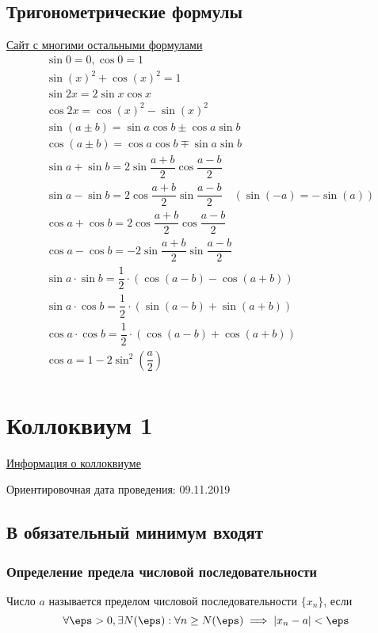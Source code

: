 \documentclass[12pt, a4paper]{article}
\begin{document}
	\subsection{Тригонометрические формулы}
	\href{https://mnogoformul.ru/vse-formuly-po-trigonometrii}{Сайт с многими остальными формулами}
	\begin{align*}
		&\sin 0 = 0, \cos 0 = 1 \\
		&\sin (x)^2 + \cos (x)^2 = 1 \\
		&\sin 2x = 2 \sin x \cos x \\
		&\cos 2x = \cos (x)^2 - \sin (x)^2 \\
		&\sin(a \pm b) = \sin a \cos b \pm \cos a \sin b \\
		&\cos(a \pm b) = \cos a \cos b \mp \sin a \sin b \\
		&\sin a + \sin b = 2 \sin \dfrac{a + b}{2} \cos \dfrac{a - b}{2} \\
		&\sin a - \sin b = 2 \cos \dfrac{a + b}{2} \sin \dfrac{a - b}{2} \quad (\sin (-a) = - \sin (a)) \\
		&\cos a + \cos b = 2 \cos \dfrac{a + b}{2} \cos \dfrac{a - b}{2} \\
		&\cos a - \cos b = -2 \sin \dfrac{a + b}{2} \sin \dfrac{a - b}{2} \\
		&\sin a \cdot \sin b = \dfrac{1}{2} \cdot (\cos (a - b) - \cos (a + b)) \\
		&\sin a \cdot \cos b = \dfrac{1}{2} \cdot (\sin (a - b) + \sin (a + b)) \\
		&\cos a \cdot \cos b = \dfrac{1}{2} \cdot (\cos (a - b) + \cos (a + b)) \\
		&\cos a = 1 - 2 \sin^2 \left(\dfrac{a}{2}\right) \\
	\end{align*}

	\section{Коллоквиум 1}
	\href{https://docs.google.com/document/d/1e-29abaRHAqDMcxA154fgHdsHKb3Npta7beZLSCfcRs/edit?usp=sharing}{Информация о коллоквиуме}

	Ориентировочная дата проведения: 09.11.2019

	\subsection{В обязательный минимум входят}
	\subsubsection{Определение предела числовой последовательности}
	Число $a$ называется пределом числовой последовательности $\{x_n\}$, если
	\begin{equation*}
		\forall \eps > 0, \exists N(\eps): \forall n \geq N(\eps) \implies |x_n - a| < \eps
	\end{equation*}
\end{document}
